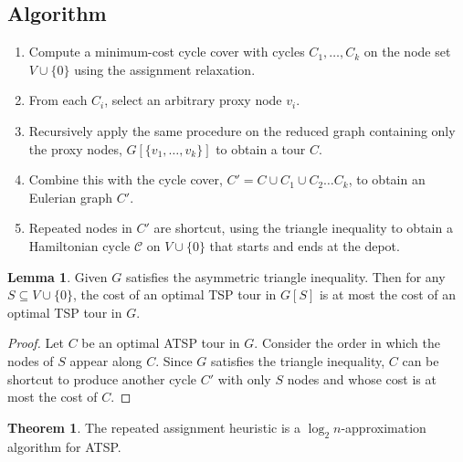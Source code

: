 \documentclass[12pt]{report}
\theoremstyle{definition}
\newtheorem{theorem}{Theorem}
\newtheorem{lemma}{Lemma}
\begin{document}
\subsection{Algorithm}
\begin{enumerate}
    \item Compute a minimum-cost cycle cover with cycles $C_1, \dots, C_k$ on the node set $V \cup \{0\}$ using the assignment relaxation.
    \item From each $C_i$, select an arbitrary proxy node $v_i$.
    \item Recursively apply the same procedure on the reduced graph containing only the proxy nodes, $G[\{v_1,\dots,v_k\}]$ to obtain a tour $C$.
    \item Combine this with the cycle cover, \(C' = C \cup C_1 \cup C_2 \dots C_k\), to obtain an Eulerian graph $C'$.
    \item Repeated nodes in $C'$ are shortcut, using the triangle inequality to obtain a Hamiltonian cycle $\mathcal{C}$ on $V \cup \{0\}$ that starts and ends at the depot.
\end{enumerate}

\begin{lemma}
Given $G$ satisfies the asymmetric triangle inequality. Then for any \( S \subseteq V \cup \{0\} \), the cost of an optimal TSP tour in $G[S]$ is at most the cost of an optimal TSP tour in $G$. 
\label{sub_bound}
\end{lemma}
\begin{proof}
Let $C$ be an optimal ATSP tour in $G$. Consider the order in which the nodes of $S$ appear along $C$. Since $G$ satisfies the triangle inequality, $C$ can be shortcut to produce another cycle $C'$ with only $S$ nodes and whose cost is at most the cost of $C$.
\end{proof}

\begin{theorem}
The repeated assignment heuristic is a $\log_2 n$-approximation algorithm for ATSP.
\end{theorem}
\end{document}
